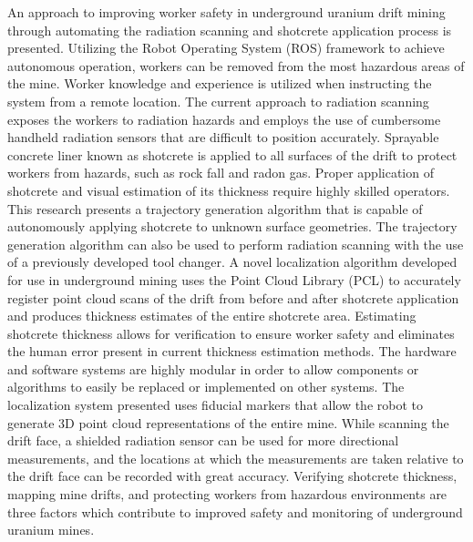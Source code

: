 \abstracter
\begin{spacing}{1.5}
An approach to improving worker safety in underground uranium drift mining through automating the radiation scanning and shotcrete application process is presented. Utilizing the Robot Operating System (ROS) framework to achieve autonomous operation, workers can be removed from the most hazardous areas of the mine. Worker knowledge and experience is utilized when instructing the system from a remote location. The current approach to radiation scanning exposes the workers to radiation hazards and employs the use of cumbersome handheld radiation sensors that are difficult to position accurately. Sprayable concrete liner known as shotcrete is applied to all surfaces of the drift to protect workers from hazards, such as rock fall and radon gas. Proper application of shotcrete and visual estimation of its thickness require highly skilled operators. This research presents a trajectory generation algorithm that is capable of autonomously applying shotcrete to unknown surface geometries. The trajectory generation algorithm can also be used to perform radiation scanning with the use of a previously developed tool changer. A novel localization algorithm developed for use in underground mining uses the Point Cloud Library (PCL) to accurately register point cloud scans of the drift from before and after shotcrete application and produces thickness estimates of the entire shotcrete area. Estimating shotcrete thickness allows for verification to ensure worker safety and eliminates the human error present in current thickness estimation methods. The hardware and software systems are highly modular in order to allow components or algorithms to easily be replaced or implemented on other systems.  The localization system presented uses fiducial markers that allow the robot to generate 3D point cloud representations of the entire mine. While scanning the drift face, a shielded radiation sensor can be used for more directional measurements, and the locations at which the measurements are taken relative to the drift face can be recorded with great accuracy. Verifying shotcrete thickness, mapping mine drifts, and protecting workers from hazardous environments are three factors which contribute to improved safety and monitoring of underground uranium mines.
\end{spacing}